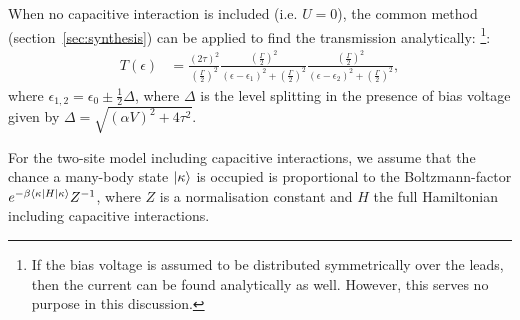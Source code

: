 When no capacitive interaction is included (i.e. $U=0$), the common method (section~\ref{sec:synthesis}) can be applied to find the transmission analytically: \cite{perrinnano}\footnote{If the bias voltage is assumed to be distributed symmetrically over the leads, then the current can be found analytically as well. However, this serves no purpose in this discussion.}:
\begin{align*}
T(\epsilon) &= \frac{ (2\tau)^2 }{(\frac{\Gamma}{2})^2} \frac{(\frac{\Gamma}{2})^2}{(\epsilon-\epsilon_1)^2 + (\frac{\Gamma}{2})^2}\frac{(\frac{\Gamma}{2})^2}{(\epsilon-\epsilon_2)^2 + (\frac{\Gamma}{2})^2},
\end{align*}
where $\epsilon_{1,2} = \epsilon_0 \pm \frac{1}{2} \Delta$, where $\Delta$ is the level splitting in the presence of bias voltage given by $\Delta = \sqrt{ (\alpha V)^2+ 4\tau^2}$. 

For the two-site model including capacitive interactions, we assume that the chance a many-body state $\ket{\kappa}$ is occupied is proportional to the Boltzmann-factor $e^{ -\beta \braket{ \kappa\left| H \right| \kappa}} Z^{-1}$, where $Z$ is a normalisation constant and $H$ the full Hamiltonian including capacitive interactions.

